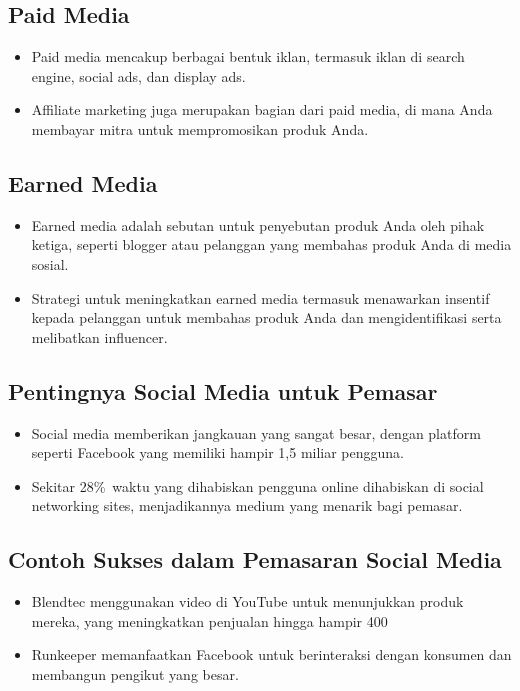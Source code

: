 \documentclass{article}
\begin{document}
\subsection{Paid Media}
\begin{itemize}
    \item Paid media mencakup berbagai bentuk iklan, termasuk iklan di search engine, social ads, dan display ads.
    \item Affiliate marketing juga merupakan bagian dari paid media, di mana Anda membayar mitra untuk mempromosikan produk Anda.
\end{itemize}

\subsection{Earned Media}
\begin{itemize}
    \item Earned media adalah sebutan untuk penyebutan produk Anda oleh pihak ketiga, seperti blogger atau pelanggan yang membahas produk Anda di media sosial.
    \item Strategi untuk meningkatkan earned media termasuk menawarkan insentif kepada pelanggan untuk membahas produk Anda dan mengidentifikasi serta melibatkan influencer.
\end{itemize}

\subsection{Pentingnya Social Media untuk Pemasar}
\begin{itemize}
    \item Social media memberikan jangkauan yang sangat besar, dengan platform seperti Facebook yang memiliki hampir 1,5 miliar pengguna.
    \item Sekitar 28\%\ waktu yang dihabiskan pengguna online dihabiskan di social networking sites, menjadikannya medium yang menarik bagi pemasar.
\end{itemize}

\subsection{Contoh Sukses dalam Pemasaran Social Media}
\begin{itemize}
    \item Blendtec menggunakan video di YouTube untuk menunjukkan produk mereka, yang meningkatkan penjualan hingga hampir 400%
    \item Runkeeper memanfaatkan Facebook untuk berinteraksi dengan konsumen dan membangun pengikut yang besar.
\end{itemize}
\end{document}
